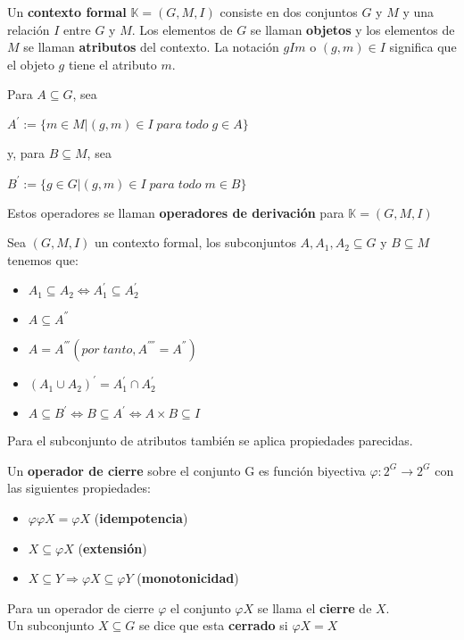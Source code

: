 \documentclass[../../main.tex]{subfiles}
\begin{document}
\begin{definicion}
Un \textbf{contexto formal} $\mathbb{K} = (G, M, I)$ consiste en dos conjuntos $G$ y $M$ y una relación $I$ entre $G$ y $M$. Los elementos de $G$ se llaman \textbf{objetos} y los elementos de $M$ se llaman \textbf{atributos} del contexto. La notación $gIm$ o $(g, m) \in I$ significa que el objeto $g$ tiene el atributo $m$.
\end{definicion}


\begin{definicion}
Para $A \subseteq G$, sea
\begin{center}
    $A^{'} := { \{m \in M | (g, m) \in I\;para\;todo\;g \in A\} }$
\end{center}
y, para $B \subseteq M$, sea
\begin{center}
    $B^{'} := { \{g \in G | (g, m) \in I\;para\;todo\;m \in B\} }$
\end{center}
\end{definicion}
Estos operadores se llaman \textbf{operadores de derivación} para $\mathbb{K} = (G, M, I)$


\begin{definicion}
Sea $(G, M, I)$ un contexto formal, los subconjuntos $A, A_1, A_2 \subseteq G$ y $B \subseteq M$ tenemos que:
\begin{itemize}
    \item $A_1 \subseteq A_2 \Longleftrightarrow A_1^{'} \subseteq A_2^{'}$
    \item $A \subseteq A^{''}$
    \item $A = A^{'''} (por\;tanto, A^{''''} = A^{''})$
    \item $(A_1 \cup A_2)^{'} = A_1^{'} \cap A_2^{'}$
    \item $A \subseteq B^{'} \Longleftrightarrow B \subseteq A^{'} \Longleftrightarrow A \times B \subseteq I$
\end{itemize}
\end{definicion}

Para el subconjunto de atributos también se aplica propiedades parecidas.


\begin{definicion}
Un \textbf{operador de cierre} sobre el conjunto G es función biyectiva $\varphi : 2^{G} \longrightarrow 2^{G}$ con las siguientes propiedades:
\begin{itemize}
    \item $\varphi \varphi X = \varphi X$ (\textbf{idempotencia})
    \item $X \subseteq \varphi X$ (\textbf{extensión})
    \item $X \subseteq Y \Longrightarrow \varphi X \subseteq \varphi Y$ (\textbf{monotonicidad})
\end{itemize}
\begin{center}
    Para un operador de cierre $\varphi$ el conjunto $\varphi X$ se llama el \textbf{cierre} de $X$. \\
    Un subconjunto $X \subseteq G$ se dice que esta \textbf{cerrado} si $\varphi X = X$
\end{center}
\end{definicion}
\end{document}
